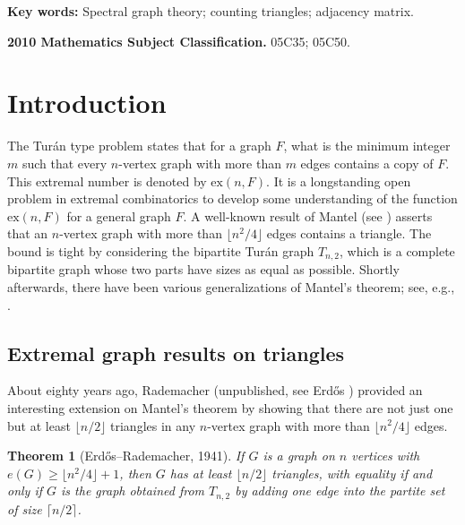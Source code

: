 \documentclass[11pt]{article}
\newtheorem{theorem}{Theorem}[section]
\begin{document}
{{\bf Key words:}   Spectral graph theory; 
counting triangles; adjacency matrix. }

{{\bf 2010 Mathematics Subject Classification.}  05C35; 05C50.}







\section{Introduction} 

The Tur\'{a}n type problem states that for a graph $F$, 
what is the minimum integer $m$ 
such that every $n$-vertex graph with more than 
 $m$ edges contains a copy of $F$. 
This extremal number  is denoted by $\mathrm{ex}(n,F)$. 
  It is a longstanding open problem in extremal combinatorics to develop some understanding of the function $\mathrm{ex}(n,F)$ 
  for a general graph $F$.  
A well-known result of Mantel 
(see \cite{Bollobas78,Lov1979}) asserts that 
an $n$-vertex graph with more than 
$\lfloor n^2/4\rfloor $ edges contains a triangle. 
The bound is tight by considering the bipartite Tur\'{a}n graph  $T_{n,2}$, which is a complete bipartite graph whose 
two parts have sizes as equal as possible. 
Shortly afterwards, 
there have been various generalizations of Mantel’s theorem; 
 see, e.g., \cite{BT1981,Bon1983}. 
 
 
 
 \subsection{Extremal graph results on triangles}

About eighty years ago, 
Rademacher (unpublished, see Erd\H{o}s \cite{Erd1955,Erdos1964}) provided  
an interesting extension on Mantel's theorem by showing that  
there are not just one but at least $\lfloor {n}/{2}\rfloor$ triangles in 
any $n$-vertex graph with more than $\lfloor {n^2}/{4} \rfloor$ edges.  


\begin{theorem}[Erd\H{o}s--Rademacher, 1941]  \label{thmrad}
If $G$ is a graph on $n$ vertices with 
$e(G)\ge  \lfloor {n^2}/{4} \rfloor +1$, 
then $G$ has at least $\lfloor {n}/{2}\rfloor$ triangles, 
with equality if and only if 
$G$ is the graph obtained from 
 $T_{n,2}$ by 
adding one edge into the partite set of size $\lceil {n}/{2}\rceil$.  
\end{theorem} 
\end{document}
